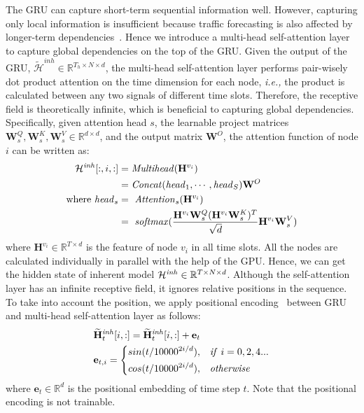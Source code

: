 \documentclass[sigconf, nonacm]{acmart}
\def\bb#1{\mathbb{#1}}
\def\b#1{\mathbf{#1}}
\def\cal#1{\mathcal{#1}}
\newcommand{\ie}{\textit{i.e.,}\xspace}
\begin{document}
The GRU can capture short-term sequential information well. 
However, capturing only local information is insufficient because traffic forecasting is also affected by longer-term dependencies~\cite{2020STGNN}. 
Hence we introduce a multi-head self-attention layer to capture global dependencies on the top of the GRU.
{\color{black}Given the output of the GRU, {\color{black} $\widetilde{\cal{H}}^{inh}\in\bb{R}^{T_h\times N\times d}$}, the multi-head self-attention layer performs pair-wisely dot product attention on the time dimension for each node, \ie the product is calculated between any two signals of different time slots.}
Therefore, the receptive field is theoretically infinite, which is beneficial to capturing global dependencies.
Specifically, given attention head $s$, the learnable project matrices $\mathbf{W}_s^{Q},\mathbf{W}_s^{K},\mathbf{W}_s^{V}\in\bb{R}^{d\times d}$, and the output matrix $\b{W}^O$, the attention function of node $i$ can be written as:
\begin{equation}
 \begin{aligned}
    {\color{black}\cal{H}^{\mathit{\color{black}inh}}}[:,i,:]&=\mathit{Multihead}(\mathbf{H}^{v_i})\\
    &=\mathit{Concat}(\mathit{head}_1,\cdots,\mathit{head}_S)\mathbf{W}^O\\
    {\rm where}\ \mathit{head}_s&=\ \mathit{Attention}_s(\mathbf{H}^{v_i}) \\
    &=\ \mathit{softmax}(\frac{\mathbf{H}^{v_i}\mathbf{W}_s^Q(\mathbf{H}^{v_i}\mathbf{W}_s^{K})^T}{\sqrt{d}}\mathbf{H}^{v_i}\mathbf{W}_s^V)
  \end{aligned}
  \label{mhsa}
\end{equation}
where $\b{H}^{v_i}\in\bb{R}^{T\times d}$ is the feature of node $v_i$ in all time slots. 
All the nodes are calculated individually in parallel with the help of the GPU. 
Hence, we can get the hidden state of {\color{black}inherent} model ${\color{black}\cal{H}^{\mathit{\color{black}inh}}}\in\bb{R}^{T\times N\times d}$.
Although the self-attention layer has an infinite receptive field, it ignores relative positions in the sequence.
To take into account the position, we apply positional encoding~\cite{2017Transformer} between GRU and multi-head self-attention layer as follows:
\begin{equation}
\begin{aligned}
     &{\color{black}\widetilde{\mathbf{H}}^{\mathit{\color{black}inh}}_{t}[i,:]=\widetilde{\mathbf{H}}^{\mathit{\color{black}inh}}_{t}[i,:]+\mathbf{e}_t} \\
     & \mathbf{e}_{t, i}=   \left\{
                    \begin{aligned} 
                            sin(t/10000^{2i/d}),\quad &\mathit{if}\ i = 0, 2, 4... \\
                            cos(t/10000^{2i/d}),\quad &\mathit{otherwise}
                    \end{aligned} 
                    \right.
\end{aligned}
\end{equation}
where $\b{e}_t\in\bb{R}^{d}$ is the positional embedding of time step $t$. Note that the positional encoding is not trainable.
\end{document}
